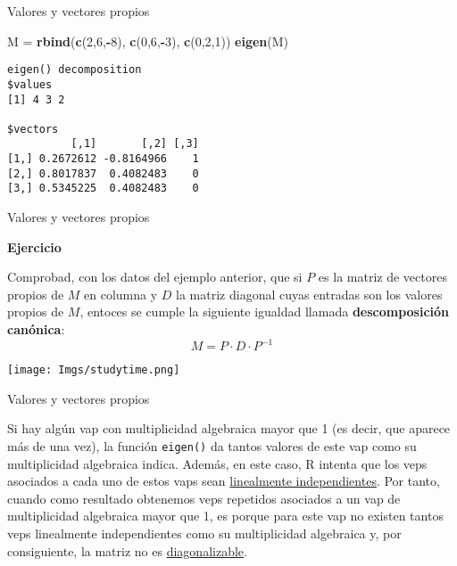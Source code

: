 \documentclass[
  ignorenonframetext,
]{beamer}
\newenvironment{Shaded}{\begin{snugshade}}{\end{snugshade}}
\newcommand{\DecValTok}[1]{\textcolor[rgb]{0.00,0.00,0.81}{#1}}
\newcommand{\KeywordTok}[1]{\textcolor[rgb]{0.13,0.29,0.53}{\textbf{#1}}}
\newcommand{\NormalTok}[1]{#1}
\newcommand{\OperatorTok}[1]{\textcolor[rgb]{0.81,0.36,0.00}{\textbf{#1}}}
\newcommand{\StringTok}[1]{\textcolor[rgb]{0.31,0.60,0.02}{#1}}
\begin{document}
\begin{frame}[fragile]{Valores y vectores propios}
\protect\hypertarget{valores-y-vectores-propios-1}{}

\begin{Shaded}
\begin{Highlighting}[]
\NormalTok{M =}\StringTok{ }\KeywordTok{rbind}\NormalTok{(}\KeywordTok{c}\NormalTok{(}\DecValTok{2}\NormalTok{,}\DecValTok{6}\NormalTok{,}\OperatorTok{-}\DecValTok{8}\NormalTok{), }\KeywordTok{c}\NormalTok{(}\DecValTok{0}\NormalTok{,}\DecValTok{6}\NormalTok{,}\OperatorTok{-}\DecValTok{3}\NormalTok{), }\KeywordTok{c}\NormalTok{(}\DecValTok{0}\NormalTok{,}\DecValTok{2}\NormalTok{,}\DecValTok{1}\NormalTok{))}
\KeywordTok{eigen}\NormalTok{(M)}
\end{Highlighting}
\end{Shaded}

\begin{verbatim}
eigen() decomposition
$values
[1] 4 3 2

$vectors
          [,1]       [,2] [,3]
[1,] 0.2672612 -0.8164966    1
[2,] 0.8017837  0.4082483    0
[3,] 0.5345225  0.4082483    0
\end{verbatim}

\end{frame}

\begin{frame}{Valores y vectores propios}
\protect\hypertarget{valores-y-vectores-propios-2}{}

\textbf{Ejercicio}

Comprobad, con los datos del ejemplo anterior, que si \(P\) es la matriz
de vectores propios de \(M\) en columna y \(D\) la matriz diagonal cuyas
entradas son los valores propios de \(M\), entoces se cumple la
siguiente igualdad llamada \textbf{descomposición canónica}:
\[M = P\cdot D\cdot P^{-1}\]

\texttt{[image: Imgs/studytime.png]}

\end{frame}

\begin{frame}[fragile]{Valores y vectores propios}
\protect\hypertarget{valores-y-vectores-propios-3}{}

Si hay algún vap con multiplicidad algebraica mayor que 1 (es decir, que
aparece más de una vez), la función \texttt{eigen()} da tantos valores
de este vap como su multiplicidad algebraica indica. Además, en este
caso, R intenta que los veps asociados a cada uno de estos vaps sean
\href{https://es.wikipedia.org/wiki/Dependencia_e_independencia_lineal}{linealmente
independientes}. Por tanto, cuando como resultado obtenemos veps
repetidos asociados a un vap de multiplicidad algebraica mayor que 1, es
porque para este vap no existen tantos veps linealmente independientes
como su multiplicidad algebraica y, por consiguiente, la matriz no es
\href{https://es.wikipedia.org/wiki/Matriz_diagonalizable}{diagonalizable}.

\end{frame}
\end{document}
